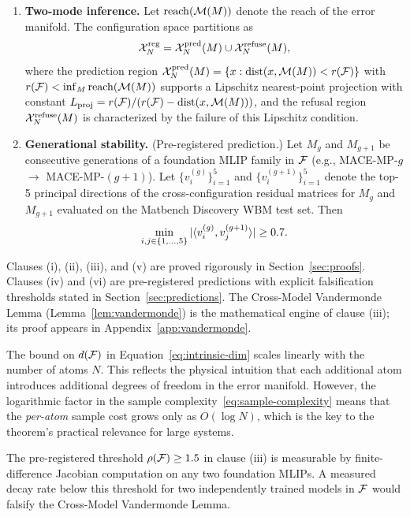 \begin{theorem}
\begin{enumerate}[label=(\roman*)]
    \item \textbf{Two-mode inference.} Let $\mathrm{reach}(\mathcal{M}(M))$ denote the reach of the error manifold. The configuration space partitions as
    \begin{equation}\label{eq:two-mode}
        \mathcal{X}_N^{\text{reg}} = \mathcal{X}_N^{\text{pred}}(M) \cup \mathcal{X}_N^{\text{refuse}}(M),
    \end{equation}
    where the prediction region $\mathcal{X}_N^{\text{pred}}(M) = \{x : \mathrm{dist}(x, \mathcal{M}(M)) < r(\mathcal{F})\}$ with $r(\mathcal{F}) < \inf_M \mathrm{reach}(\mathcal{M}(M))$ supports a Lipschitz nearest-point projection with constant $L_{\text{proj}} = r(\mathcal{F}) / (r(\mathcal{F}) - \mathrm{dist}(x, \mathcal{M}(M)))$, and the refusal region $\mathcal{X}_N^{\text{refuse}}(M)$ is characterized by the failure of this Lipschitz condition.

    \item \textbf{Generational stability.} (Pre-registered prediction.) Let $M_g$ and $M_{g+1}$ be consecutive generations of a foundation MLIP family in $\mathcal{F}$ (e.g., MACE-MP-$g$ $\to$ MACE-MP-$(g+1)$). Let $\{v_i^{(g)}\}_{i=1}^5$ and $\{v_i^{(g+1)}\}_{i=1}^5$ denote the top-5 principal directions of the cross-configuration residual matrices for $M_g$ and $M_{g+1}$ evaluated on the Matbench Discovery WBM test set. Then
    \begin{equation}\label{eq:generational-stability}
        \min_{i,j \in \{1,\dots,5\}} |\langle v_i^{(g)}, v_j^{(g+1)} \rangle| \geq 0.7.
    \end{equation}
\end{enumerate}
\end{theorem}

\begin{remark}
Clauses (i), (ii), (iii), and (v) are proved rigorously in Section~\ref{sec:proofs}. Clauses (iv) and (vi) are pre-registered predictions with explicit falsification thresholds stated in Section~\ref{sec:predictions}. The Cross-Model Vandermonde Lemma (Lemma~\ref{lem:vandermonde}) is the mathematical engine of clause (iii); its proof appears in Appendix~\ref{app:vandermonde}.
\end{remark}

\begin{remark}
The bound on $d(\mathcal{F})$ in Equation~\eqref{eq:intrinsic-dim} scales linearly with the number of atoms $N$. This reflects the physical intuition that each additional atom introduces additional degrees of freedom in the error manifold. However, the logarithmic factor in the sample complexity~\eqref{eq:sample-complexity} means that the \emph{per-atom} sample cost grows only as $O(\log N)$, which is the key to the theorem's practical relevance for large systems.
\end{remark}

\begin{remark}
The pre-registered threshold $\rho(\mathcal{F}) \geq 1.5$ in clause (iii) is measurable by finite-difference Jacobian computation on any two foundation MLIPs. A measured decay rate below this threshold for two independently trained models in $\mathcal{F}$ would falsify the Cross-Model Vandermonde Lemma.
\end{remark}
